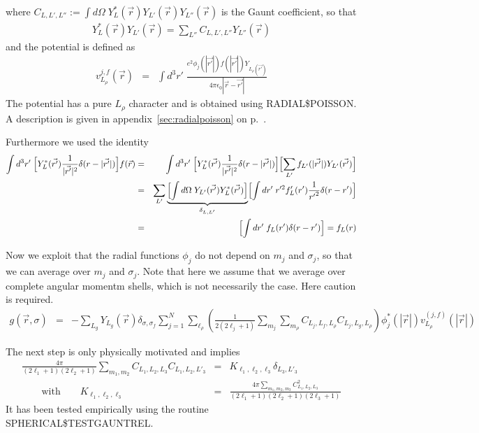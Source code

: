 \documentclass[11pt,a4paper]{report}
\begin{document}
where $C_{L,L',L''}:=\int d\Omega\;
Y^*_L(\vec{r})Y_{L'}(\vec{r})Y_{L''}(\vec{r})$ is the Gaunt
coefficient, so that
\begin{eqnarray*}
Y^*_L(\vec{r})Y_{L'}(\vec{r})=\sum_{L''}C_{L,L',L''}Y_{L''}(\vec{r})
\end{eqnarray*}
and the potential is defined as
\begin{eqnarray*}
v_{L_\rho}^{j,f}(\vec{r})&=&\int d^3r'\;
\frac{e^2\phi_j(|\vec{r'}|)f(|\vec{r'}|)Y_{L_{\rho}(\vec{r'})}}
{4\pi\epsilon_0|\vec{r}-\vec{r'}|}
\end{eqnarray*}
The potential has a pure $L_\rho$ character and is obtained using
RADIAL\$POISSON. A description is given in
appendix~\ref{sec:radialpoisson} on p.~\pageref{sec:radialpoisson}.

Furthermore we used the identity
\begin{eqnarray*}
\int d^3r'\;  \Bigl[Y^*_L(\vec{r'})\frac{1}{|\vec{r'}|^2}
\delta(r-|\vec{r'}|)\Bigr]f(\vec{r})
&=&\int d^3r'\;  
\Bigl[Y^*_L(\vec{r'})\frac{1}{|\vec{r'}|^2}\delta(r-|\vec{r'}|)\Bigr]
\Bigl[\sum_{L'}f_{L'}(|\vec{r'}|)Y_{L'}(\vec{r'})\Bigr]
\\
&=&\sum_{L'}
\underbrace{\Bigl[\int d\Omega\; Y_{L'}(\vec{r'}) Y^*_L(\vec{r'})\Bigr]}_{\delta_{L,L'}}
\Bigl[\int dr'\;r'^2 f_L'(r')\frac{1}{{r'}^2}\delta(r-r')\Bigr]
\\
&=&\Bigl[\int dr'\;f_L(r')\delta(r-r')\Bigr]
=f_L(r)
\end{eqnarray*}


Now we exploit that the radial functions $\phi_j$ do not depend on
$m_j$ and $\sigma_j$, so that we can average over $m_j$ and
$\sigma_j$. Note that here we assume that we average over complete
angular momentm shells, which is not necessarily the case. Here
caution is required.
\begin{eqnarray*}
g(\vec{r},\sigma)
&=&-\sum_{L_g}Y_{L_g}(\vec{r})\delta_{\sigma,\sigma_f}
\sum_{j=1}^N
\sum_{\ell_\rho}
\left(\frac{1}{2(2\ell_j+1)}
\sum_{m_j}\sum_{m_\rho}C_{L_j,L_f,L_\rho} C_{L_j,L_g,L_\rho}\right)
\phi_j^*(|\vec{r}|)v_{L_\rho}^{(j,f)}(|\vec{r}|)
\end{eqnarray*}

The next step is only physically motivated and implies
\begin{eqnarray*}
\frac{4\pi}{ (2\ell_1+1)(2\ell_2+1)}
\sum_{m_1,m_2}C_{L_1,L_2,L_3} C_{L_1,L_2,L'_3}&=&K_{\ell_1,\ell_2,\ell_3}\delta_{L_3,L'_3}
\\
\qquad\text{with}\qquad K_{\ell_1,\ell_2,\ell_3}&=&
\frac{4\pi\sum_{m_1,m_2,m_3}C_{L_1,L_2,L_3}^2}
{(2\ell_1+1)(2\ell_2+1)(2\ell_3+1)}
\end{eqnarray*}
It has been tested empirically using the routine SPHERICAL\$TESTGAUNTREL.
\end{document}
